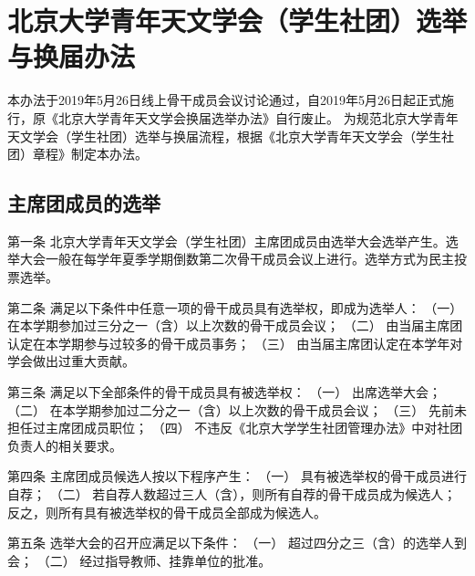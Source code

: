 \chapter{北京大学青年天文学会（学生社团）选举与换届办法}

本办法于2019年5月26日线上骨干成员会议讨论通过，自2019年5月26日起正式施行，原《北京大学青年天文学会换届选举办法》自行废止。
为规范北京大学青年天文学会（学生社团）选举与换届流程，根据《北京大学青年天文学会（学生社团）章程》制定本办法。

\section{主席团成员的选举}

第一条  北京大学青年天文学会（学生社团）主席团成员由选举大会选举产生。选举大会一般在每学年夏季学期倒数第二次骨干成员会议上进行。选举方式为民主投票选举。

第二条  满足以下条件中任意一项的骨干成员具有选举权，即成为选举人：
（一）  在本学期参加过三分之一（含）以上次数的骨干成员会议；
（二）  由当届主席团认定在本学期参与过较多的骨干成员事务；
（三）  由当届主席团认定在本学年对学会做出过重大贡献。

第三条  满足以下全部条件的骨干成员具有被选举权：
（一）  出席选举大会；
（二）  在本学期参加过二分之一（含）以上次数的骨干成员会议；
（三）  先前未担任过主席团成员职位；
（四）  不违反《北京大学学生社团管理办法》中对社团负责人的相关要求。

第四条  主席团成员候选人按以下程序产生：
（一）  具有被选举权的骨干成员进行自荐；
（二）  若自荐人数超过三人（含），则所有自荐的骨干成员成为候选人；反之，则所有具有被选举权的骨干成员全部成为候选人。

第五条  选举大会的召开应满足以下条件：
（一）  超过四分之三（含）的选举人到会；
（二）  经过指导教师、挂靠单位的批准。


